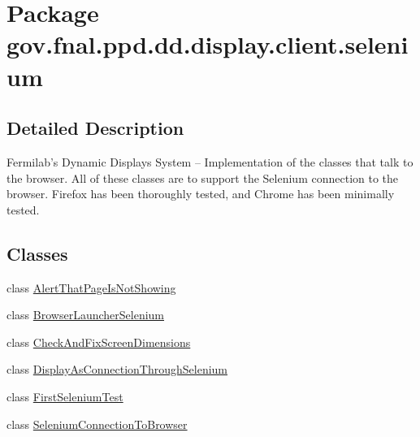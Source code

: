 \hypertarget{namespacegov_1_1fnal_1_1ppd_1_1dd_1_1display_1_1client_1_1selenium}{\section{Package gov.\-fnal.\-ppd.\-dd.\-display.\-client.\-selenium}
\label{namespacegov_1_1fnal_1_1ppd_1_1dd_1_1display_1_1client_1_1selenium}
}


\subsection{Detailed Description}
Fermilab's Dynamic Displays System -- Implementation of the classes that talk to the browser. All of these classes are to support the Selenium connection to the browser. Firefox has been thoroughly tested, and Chrome has been minimally tested. \subsection*{Classes}
\begin{DoxyCompactItemize}
\item 
class \hyperlink{classgov_1_1fnal_1_1ppd_1_1dd_1_1display_1_1client_1_1selenium_1_1AlertThatPageIsNotShowing}{Alert\-That\-Page\-Is\-Not\-Showing}
\item 
class \hyperlink{classgov_1_1fnal_1_1ppd_1_1dd_1_1display_1_1client_1_1selenium_1_1BrowserLauncherSelenium}{Browser\-Launcher\-Selenium}
\item 
class \hyperlink{classgov_1_1fnal_1_1ppd_1_1dd_1_1display_1_1client_1_1selenium_1_1CheckAndFixScreenDimensions}{Check\-And\-Fix\-Screen\-Dimensions}
\item 
class \hyperlink{classgov_1_1fnal_1_1ppd_1_1dd_1_1display_1_1client_1_1selenium_1_1DisplayAsConnectionThroughSelenium}{Display\-As\-Connection\-Through\-Selenium}
\item 
class \hyperlink{classgov_1_1fnal_1_1ppd_1_1dd_1_1display_1_1client_1_1selenium_1_1FirstSeleniumTest}{First\-Selenium\-Test}
\item 
class \hyperlink{classgov_1_1fnal_1_1ppd_1_1dd_1_1display_1_1client_1_1selenium_1_1SeleniumConnectionToBrowser}{Selenium\-Connection\-To\-Browser}
\end{DoxyCompactItemize}
